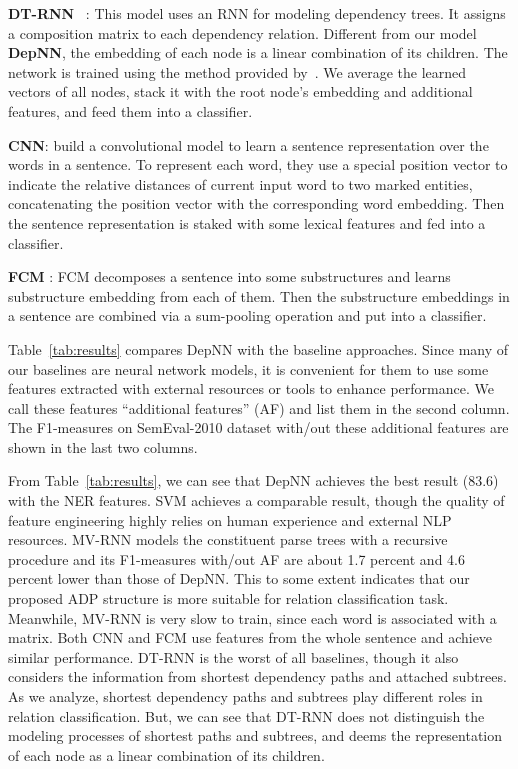 \documentclass[11pt]{article}
\begin{document}
{\bf DT-RNN}~\cite{socher2014grounded} :
This model uses an RNN for modeling dependency trees. It assigns a composition matrix to each dependency relation.
Different from our model \textbf{DepNN}, the embedding of each node is a linear combination of its children.
The network is trained using the method provided by~\cite{iyyer2014neural}. We average the learned vectors of all nodes, stack it with the root node's embedding  and additional features, and feed them into a  classifier.

{\bf CNN}:
 build a convolutional model to learn a sentence representation over the words in a sentence.
To represent each word, they use a special position vector to indicate the relative distances of current input word to two marked entities,
concatenating the position vector with the corresponding word embedding.
Then the sentence representation  is  staked with some lexical features and fed into a  classifier.


{\bf FCM} \cite{MoYu2014qv}:
FCM decomposes a sentence into some substructures and learns substructure embedding from each of them.
Then the substructure embeddings in a sentence are combined via a sum-pooling operation and put into a  classifier.


Table~\ref{tab:results} compares DepNN with the baseline approaches.
Since many of our baselines are neural network models, it is convenient for them to use some features extracted with external resources or tools to enhance performance. We call these features ``additional features'' (AF) and list them in the second column.  The F1-measures on SemEval-2010 dataset  with/out these additional features are shown in the last two columns.

From Table~\ref{tab:results}, we can see that DepNN achieves the best result (83.6) with the NER  features.
SVM achieves a comparable result, though the quality of feature engineering highly relies on human experience and external NLP resources.
MV-RNN  models the constituent parse trees with a recursive procedure and its F1-measures with/out AF are about 1.7 percent and 4.6 percent lower than those of DepNN.
This to some extent indicates that our proposed  ADP structure is  more suitable for relation classification task.
Meanwhile, MV-RNN is very slow to train, since each word is associated with a matrix.
Both CNN and FCM use features from the whole sentence and achieve similar performance.
DT-RNN is the worst of all  baselines, though it also considers the information from shortest dependency paths and attached subtrees.
As we analyze, shortest dependency paths and subtrees play different roles in relation classification.
But, we can see that DT-RNN does not distinguish the modeling processes of shortest paths and subtrees, and deems the representation of each node as a linear combination of its children.
\end{document}
